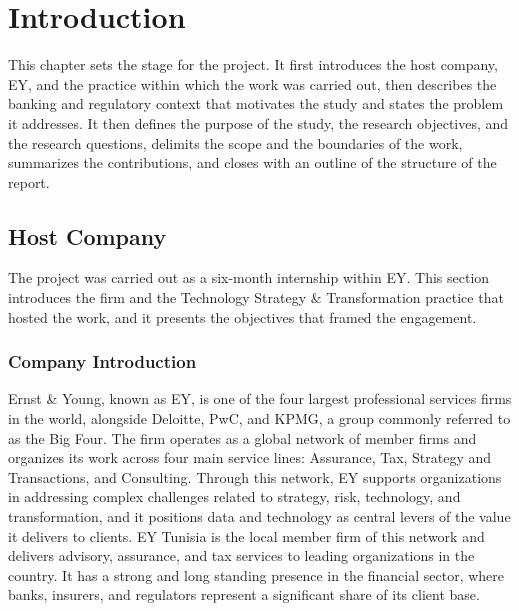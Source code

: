 
\section{Introduction}

This chapter sets the stage for the project. It first introduces the host company, EY, and the practice within which the work was carried out, then describes the banking and regulatory context that motivates the study and states the problem it addresses. It then defines the purpose of the study, the research objectives, and the research questions, delimits the scope and the boundaries of the work, summarizes the contributions, and closes with an outline of the structure of the report.

\subsection{Host Company}

The project was carried out as a six-month internship within EY. This section introduces the firm and the Technology Strategy \& Transformation practice that hosted the work, and it presents the objectives that framed the engagement.

\subsubsection{Company Introduction}

Ernst \& Young, known as EY, is one of the four largest professional services firms in the world, alongside Deloitte, PwC, and KPMG, a group commonly referred to as the Big Four. The firm operates as a global network of member firms and organizes its work across four main service lines: Assurance, Tax, Strategy and Transactions, and Consulting. Through this network, EY supports organizations in addressing complex challenges related to strategy, risk, technology, and transformation, and it positions data and technology as central levers of the value it delivers to clients. EY Tunisia is the local member firm of this network and delivers advisory, assurance, and tax services to leading organizations in the country. It has a strong and long standing presence in the financial sector, where banks, insurers, and regulators represent a significant share of its client base.

